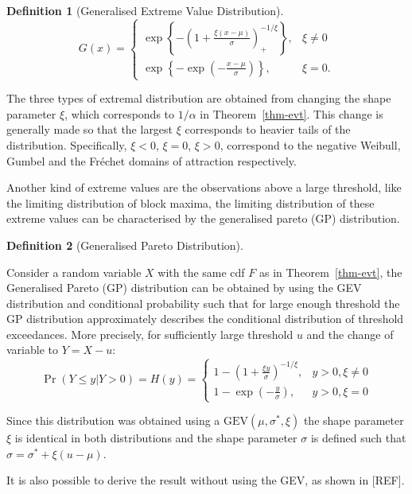 \documentclass[
  10pt,
  a4paper,
]{scrreprt}
\theoremstyle{plain}
\theoremstyle{plain}
\theoremstyle{definition}
\newtheorem{definition}{Definition}[section]
\theoremstyle{plain}
\theoremstyle{remark}
\begin{document}
{\begin{definition}[Generalised Extreme Value
Distribution]
\[
G(x) = \begin{cases}\exp\left\{-\left(1+\displaystyle\frac{\xi(x-\mu)}{\sigma}\right)_+^{-1/\xi}\right\},&\xi\ne0\\
\exp\left\{-\exp\left(-\displaystyle\frac{x-\mu}{\sigma}\right)\right\},&\xi=0.
\end{cases}
\]

\end{definition}

The three types of extremal distribution are obtained from changing the
shape parameter \(\xi\), which corresponds to \(1/\alpha\) in
Theorem~\ref{thm-evt}. This change is generally made so that the largest
\(\xi\) corresponds to heavier tails of the distribution. Specifically,
\(\xi<0\), \(\xi=0\), \(\xi>0\), correspond to the negative Weibull,
Gumbel and the Fréchet domains of attraction respectively.

Another kind of extreme values are the observations above a large
threshold, like the limiting distribution of block maxima, the limiting
distribution of these extreme values can be characterised by the
generalised pareto (GP) distribution.

\begin{definition}[Generalised Pareto
Distribution]\protect\hypertarget{def-gp}{}\label{def-gp}

Consider a random variable \(X\) with the same cdf \(F\) as in
Theorem~\ref{thm-evt}, the Generalised Pareto (GP) distribution can be
obtained by using the GEV distribution and conditional probability such
that for large enough threshold the GP distribution approximately
describes the conditional distribution of threshold exceedances. More
precisely, for sufficiently large threshold \(u\) and the change of
variable to \(Y=X-u\): \[
\Pr(Y\le y | Y>0) = H(y) = \begin{cases}
1-\left(1+\displaystyle\frac{\xi y}{\sigma}\right)^{-1/\xi},&y>0,\xi\ne 0 \\
1-\exp\left(-\displaystyle\frac{y}{\sigma}\right),&y>0,\xi = 0
\end{cases}
\]

\end{definition}

Since this distribution was obtained using a
\(\text{GEV}(\mu,\sigma^*,\xi)\) the shape parameter \(\xi\) is
identical in both distributions and the shape parameter \(\sigma\) is
defined such that \(\sigma = \sigma^* + \xi(u-\mu)\).

It is also possible to derive the result without using the GEV, as shown
in {[}REF{]}.

}
\end{document}
